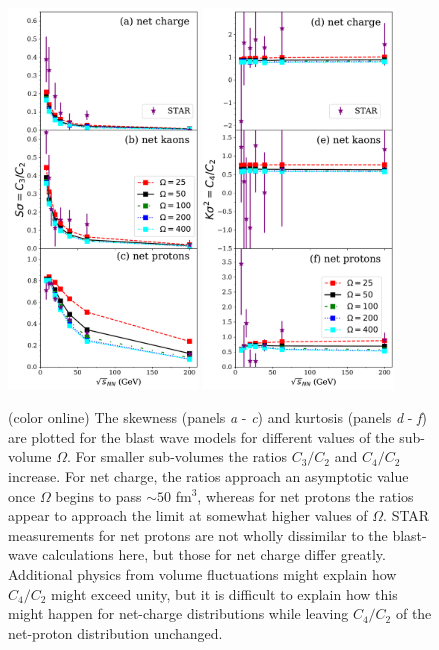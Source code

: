 \begin{figure}[htb]
\centerline{\includegraphics[width=0.45\textwidth]{figs/bw_skewness_omega}\hspace{0.06\textwidth}
\includegraphics[width=0.45\textwidth]{figs/bw_kurtosis_omega}}
\caption{\label{fig:bw_vs_omega}(color online) The skewness (panels {\it a} - {\it c}) and kurtosis (panels {\it d} - {\it f}) are plotted for the blast wave models for different values of the sub-volume $\Omega$. For smaller sub-volumes the ratios $C_3/C_2$ and $C_4/C_2$ increase. For net charge, the ratios approach an asymptotic value once $\Omega$ begins to pass $\sim 50$ fm$^3$, whereas for net protons the ratios appear to approach the limit at somewhat higher values of $\Omega$. STAR measurements for net protons are not wholly dissimilar to the blast-wave calculations here, but those for net charge differ greatly. Additional physics from volume fluctuations might explain how $C_4/C_2$ might exceed unity, but it is difficult to explain how this might happen for net-charge distributions while leaving $C_4/C_2$ of the net-proton distribution unchanged.}
\end{figure}

